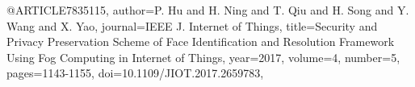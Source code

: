 @ARTICLE{7835115,
author={P. Hu and H. Ning and T. Qiu and H. Song and Y. Wang and X. Yao},
journal={IEEE J. Internet of Things},
title={{Security and Privacy Preservation Scheme of Face Identification and Resolution Framework Using Fog Computing in Internet of Things}},
year={2017},
volume={4},
number={5},
pages={1143-1155},
doi={10.1109/JIOT.2017.2659783},
}